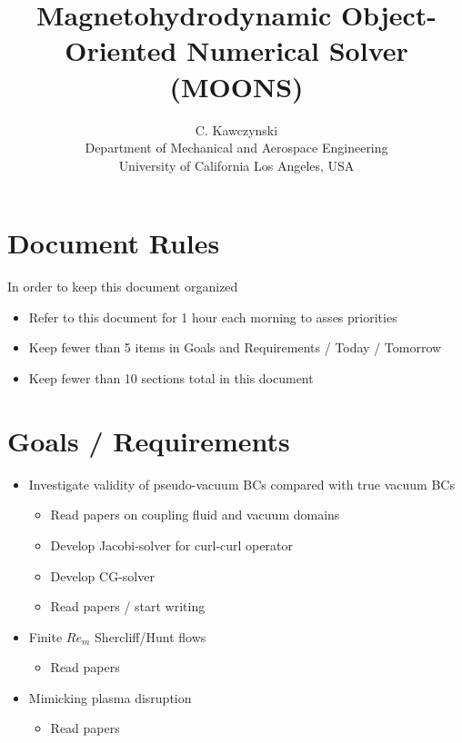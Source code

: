 \documentclass[3p,twocolumn,10pt]{elsarticle}
\begin{document}
\doublespacing
\title{Magnetohydrodynamic Object-Oriented Numerical Solver (MOONS)}
\author{C. Kawczynski \\
Department of Mechanical and Aerospace Engineering \\
University of California Los Angeles, USA\\
}
\maketitle

\section{Document Rules}
In order to keep this document organized
\begin{itemize}
\item Refer to this document for 1 hour each morning to asses priorities
\item Keep fewer than 5 items in Goals and Requirements / Today / Tomorrow
\item Keep fewer than 10 sections total in this document
\end{itemize}

\section{Goals / Requirements}

\begin{itemize}
\item Investigate validity of pseudo-vacuum BCs compared with true vacuum BCs
	\begin{itemize}
	\item Read papers on coupling fluid and vacuum domains
	\item Develop Jacobi-solver for curl-curl operator
	\item Develop CG-solver
	\item Read papers / start writing
	\end{itemize}
\item Finite $Re_m$ Shercliff/Hunt flows
	\begin{itemize}
	\item Read papers
	\end{itemize}
\item Mimicking plasma disruption
	\begin{itemize}
	\item Read papers
	\end{itemize}
\end{itemize}
\end{document}
